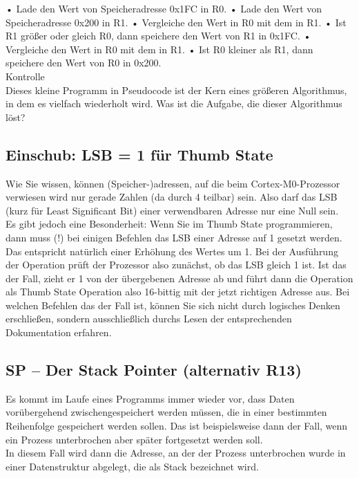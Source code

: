 •	Lade den Wert von Speicheradresse 0x1FC in R0.
•	Lade den Wert von Speicheradresse 0x200 in R1.
•	Vergleiche den Wert in R0 mit dem in R1.
•	Ist R1 größer oder gleich R0, dann speichere den Wert von R1 in 0x1FC.
•	Vergleiche den Wert in R0 mit dem in R1.
•	Ist R0 kleiner als R1, dann speichere den Wert von R0 in 0x200.\\

Kontrolle\\

Dieses kleine Programm in Pseudocode ist der Kern eines größeren Algorithmus, in dem es vielfach wiederholt wird. Was ist die Aufgabe, die dieser Algorithmus löst?

\subsection{Einschub: LSB = 1 für Thumb State}

Wie Sie wissen, können (Speicher-)adressen, auf die beim Cortex-M0-Prozessor verwiesen wird nur gerade Zahlen (da durch 4 teilbar) sein. Also darf das LSB (kurz für Least Significant Bit) einer verwendbaren Adresse nur eine Null sein.\\

Es gibt jedoch eine Besonderheit: Wenn Sie im Thumb State programmieren, dann muss (!) bei einigen Befehlen das LSB einer Adresse auf 1 gesetzt werden. Das entspricht natürlich einer Erhöhung des Wertes um 1. Bei der Ausführung der Operation prüft der Prozessor also zunächst, ob das LSB gleich 1 ist. Ist das der Fall, zieht er 1 von der übergebenen Adresse ab und führt dann die Operation als Thumb State Operation also 16-bittig mit der jetzt richtigen Adresse aus. Bei welchen Befehlen das der Fall ist, können Sie sich nicht durch logisches Denken erschließen, sondern ausschließlich durchs Lesen der entsprechenden Dokumentation erfahren.

\subsection{SP – Der Stack Pointer (alternativ R13)}

Es kommt im Laufe eines Programms immer wieder vor, dass Daten vorübergehend zwischengespeichert werden müssen, die in einer bestimmten Reihenfolge gespeichert werden sollen. Das ist beispielsweise dann der Fall, wenn ein Prozess unterbrochen aber später fortgesetzt werden soll.\\

In diesem Fall wird dann die Adresse, an der der Prozess unterbrochen wurde in einer Datenstruktur abgelegt, die als Stack bezeichnet wird.\\

